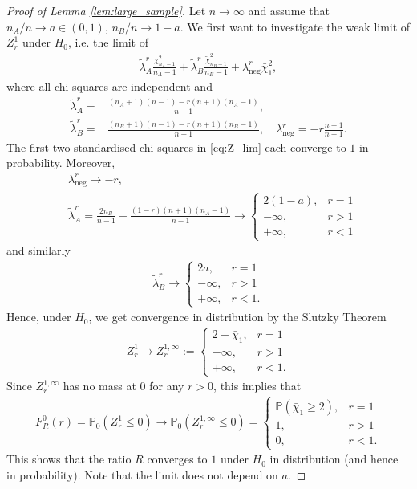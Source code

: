 \documentclass[11pt,a4paper]{article}
\renewcommand{\P}{\operatorname{P}}
\renewcommand{\P}{\mathbb{P}}  %
\begin{document}
\begin{proof}[Proof of Lemma \ref{lem:large_sample}]
	Let $n \to \infty$ and assume that $n_A /n \to a \in (0, 1)$, $n_B/n \to 1 - a$. We first want to investigate the weak limit of $Z_r^1$ under $H_0$, i.e. the limit of
	\begin{align}\label{eq:Z_lim}
		\tilde \lambda_A^r \frac{\chi^2_{n_A - 1}}{n_A - 1} + \tilde \lambda_B^r \frac{\tilde \chi^2_{n_B - 1}}{n_B - 1} + \lambda_{\text{neg}}^r \bar \chi^2_{1},
	\end{align}
	where all chi-squares are independent and
	\begin{align*}
		\tilde \lambda_A^r = & \frac{(n_A + 1)(n-1) - r(n+1)(n_A-1)}{n-1},                                                    \\
		\tilde \lambda_B^r = & \frac{(n_B + 1)(n-1) - r(n+1)(n_B-1)}{n-1}, \quad \lambda_{\text{neg}}^r = -r \frac{n+1}{n-1}.
	\end{align*}
	The first two standardised chi-squares in \eqref{eq:Z_lim} each converge to $1$ in probability. Moreover,
	\begin{align*}
		 & \lambda_{\text{neg}}^r \to - r,                                          \\
		 & \tilde \lambda_A^r = \frac{2 n_B}{n-1} + \frac{(1-r)(n+1)(n_A - 1)}{n-1}
		\to
		\begin{cases}
			2(1-a),   & r=1  \\
			- \infty, & r >1 \\
			+ \infty, & r <1
		\end{cases}
	\end{align*}
	and similarly
	\begin{align*}
		\tilde \lambda_B^r
		\to
		\begin{cases}
			2a,       & r=1   \\
			- \infty, & r >1  \\
			+ \infty, & r <1.
		\end{cases}
	\end{align*}
	Hence, under $H_0$, we get convergence in distribution by the Slutzky Theorem
	\begin{align*}
		Z_r^1 \to Z_r^{1,\infty} :=
		\begin{cases}
			2 - \bar \chi_{1}, & r=1   \\
			- \infty,          & r >1  \\
			+ \infty,          & r <1.
		\end{cases}
	\end{align*}
	Since $Z_{r}^{1,\infty}$ has no mass at $0$ for any $r > 0$, this implies that
	\begin{align*}
		F_R^0(r) = \P_0(Z_r^1 \leq 0) \to \P_0(Z_r^{1, \infty} \leq 0) =
		\begin{cases}
			\P(\bar \chi_{1} \geq 2), & r=1   \\
			1,                        & r >1  \\
			0,                        & r <1.
		\end{cases}
	\end{align*}
	This shows that the ratio $R$ converges to $1$ under $H_0$ in distribution (and hence in probability). Note that the limit does not depend on $a$.


\end{proof}
\end{document}
